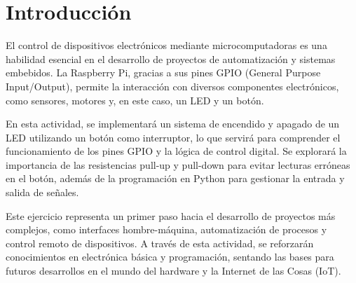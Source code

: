\section{Introducción}
El control de dispositivos electrónicos mediante microcomputadoras es una habilidad esencial en el desarrollo de proyectos de automatización y sistemas embebidos. La Raspberry Pi, gracias a sus pines GPIO (General Purpose Input/Output), permite la interacción con diversos componentes electrónicos, como sensores, motores y, en este caso, un LED y un botón.

En esta actividad, se implementará un sistema de encendido y apagado de un LED utilizando un botón como interruptor, lo que servirá para comprender el funcionamiento de los pines GPIO y la lógica de control digital. Se explorará la importancia de las resistencias pull-up y pull-down para evitar lecturas erróneas en el botón, además de la programación en Python para gestionar la entrada y salida de señales.

Este ejercicio representa un primer paso hacia el desarrollo de proyectos más complejos, como interfaces hombre-máquina, automatización de procesos y control remoto de dispositivos. A través de esta actividad, se reforzarán conocimientos en electrónica básica y programación, sentando las bases para futuros desarrollos en el mundo del hardware y la Internet de las Cosas (IoT).
\newpage
